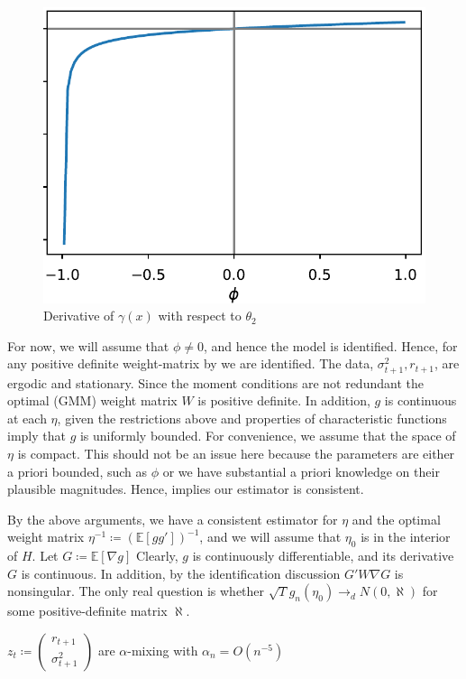 \documentclass[11pt]{article}
\newcommand*{\E}{\mathbb{E}}
\newcommand*{\N}{N}
\newcommand*{\dto}{\ensuremath{\to_d}}
\newcommand*{\Eta}{H}
\begin{document}
\begin{figure}[htb]
    \centering
    \caption{Derivative of $\gamma(x)$ with respect to $\theta_2$}
    \label{fig:fig:gamma_diff_theta2}
    \includegraphics[width=.5\textwidth]{gamma_diff_theta2.pdf}
\end{figure}


For now, we will assume that $\phi \neq 0$, and hence the model is identified.
Hence, for any positive definite weight-matrix by \textcite[Lemma 2.3]{newey1994large} we are identified.
The data, $\sigma^2_{t+1}, r_{t+1}$, are ergodic and stationary.
Since the moment conditions are not redundant the optimal (GMM) weight matrix $W$ is positive definite. 
In addition, $g$ is continuous at each $\eta$, given the restrictions above and properties of characteristic
functions imply that $g$ is uniformly bounded. 
For convenience, we assume that the space of $\eta$ is compact.
This should not be an issue here because the parameters  are either a priori bounded, such as $\phi$ or we have
substantial a priori knowledge on their plausible magnitudes.
Hence, \textcite[Theroem 2.6]{newey1994large} implies our estimator is consistent.

By the above arguments, we have a consistent estimator for $\eta$ and the optimal weight matrix $\eta^{-1}
\coloneqq (\E\left[g g'\right])^{-1}$, and we will assume that $\eta_0$ is in the interior of $\Eta$.
Let $G \coloneqq \E\left[\nabla g\right]$
Clearly, $g$ is continuously differentiable, and its derivative $G$ is continuous.
In addition, by the identification discussion $G' W \nabla G$ is nonsingular.
The only real question is whether $\sqrt{T} g_n(\eta_0) \dto \N(0, \aleph)$ for some positive-definite matrix
$\aleph$.

\begin{assump}
    \label{assumption:weak_dependence}
    $z_t \coloneqq \begin{pmatrix} r_{t+1} \\ \sigma^2_{t+1} \end{pmatrix}$ are $\alpha$-mixing with $\alpha_n =
       O\left(n^{-5}\right)$
\end{assump}
\end{document}
